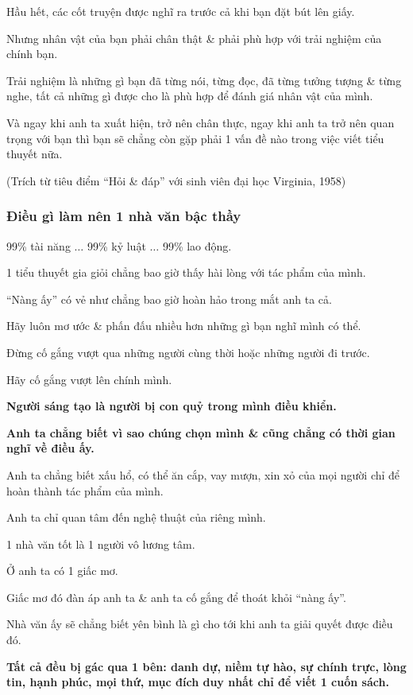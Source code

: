 \documentclass{article}
\begin{document}
Hầu hết, các cốt truyện được nghĩ ra trước cả khi bạn đặt bút lên giấy.

%
Nhưng nhân vật của bạn phải chân thật \& phải phù hợp với trải nghiệm của chính bạn.

Trải nghiệm là những gì bạn đã từng nói, từng đọc, đã từng tưởng tượng \& từng nghe, tất cả những gì được cho là phù hợp để đánh giá nhân vật của mình.

Và ngay khi anh ta xuất hiện, trở nên chân thực, ngay khi anh ta trở nên quan trọng với bạn thì bạn sẽ chẳng còn gặp phải 1 vấn đề nào trong việc viết tiểu thuyết nữa.

(Trích từ tiêu điểm ``Hỏi \& đáp'' với sinh viên đại học Virginia, 1958)

\subsubsection{Điều gì làm nên 1 nhà văn bậc thầy}
99\% tài năng $\ldots$ 99\% kỷ luật $\ldots$ 99\% lao động.

1 tiểu thuyết gia giỏi chẳng bao giờ thấy hài lòng với tác phẩm của mình.

``Nàng ấy'' có vẻ như chẳng bao giờ hoàn hảo trong mắt anh ta cả.

Hãy luôn mơ ước \& phấn đấu nhiều hơn những gì bạn nghĩ mình có thể.

Đừng cố gắng vượt qua những người cùng thời hoặc những người đi trước.

Hãy cố gắng vượt lên chính mình.

\textbf{Người sáng tạo là người bị con quỷ trong mình điều khiển.}

\textbf{Anh ta chẳng biết vì sao chúng chọn mình \& cũng chẳng có thời gian nghĩ về điều ấy.}

Anh ta chẳng biết xấu hổ, có thể ăn cắp, vay mượn, xin xỏ của mọi người chỉ để hoàn thành tác phẩm của mình.

Anh ta chỉ quan tâm đến nghệ thuật của riêng mình.

1 nhà văn tốt là 1 người vô lương tâm.

Ở anh ta có 1 giấc mơ.

Giấc mơ đó đàn áp anh ta \& anh ta cố gắng để thoát khỏi ``nàng ấy''.

Nhà văn ấy sẽ chẳng biết yên bình là gì cho tới khi anh ta giải quyết được điều đó.

\textbf{Tất cả đều bị gác qua 1 bên: danh dự, niềm tự hào, sự chính trực, lòng tin, hạnh phúc, mọi thứ, mục đích duy nhất chỉ để viết 1 cuốn sách.}
\end{document}
